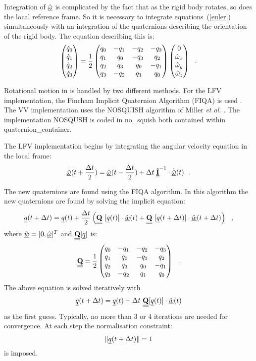 Integration of $\hat{\mbox{$\underline{\omega}$}}$ is complicated by the fact that as the
rigid body rotates, so does the local reference frame.  So it is necessary
to integrate equations~(\ref{euler}) simultaneously with an integration of
the quaternions describing the orientation of the rigid body.  The equation
describing this is:
\begin{equation}
\begin{pmatrix}
\dot{q}_0 \cr \dot{q}_1 \cr \dot{q}_2 \cr \dot{q}_3 \cr
\end{pmatrix}= {1 \over 2}
\begin{pmatrix}
q_0 & -q_1 & -q_2 & -q_3 \cr
q_1 & ~q_0 & -q_3 & ~q_2 \cr
q_2 & ~q_3 & ~q_0 & -q_1 \cr
q_3 & -q_2 & ~q_1 & ~q_0
\end{pmatrix}
\begin{pmatrix}
0 \cr \hat{\omega}_{x} \cr \hat{\omega}_{y} \cr \hat{\omega}_{z}
\end{pmatrix}~~.
\end{equation}

Rotational motion in \D is handled by two different methods.  For the LFV implementation,
the Fincham Implicit Quaternion Algorithm (FIQA) is used
\cite{fincham-92a}.  The VV implementation uses the NOSQUISH
algorithm of Miller {\em et al.} \cite{miller-02a}.  The implementation NOSQUSH is coded in {\sc no\_squish} both contained within
{\sc quaternion\_container}.

The LFV implementation begins by integrating the angular velocity equation in the local frame:
\begin{equation}
\hat{\mbox{$\underline{\omega}$}}(t+{ \Delta t\over 2}) = \hat{\mbox{$\underline{\omega}$}}(t-{ \Delta t\over 2}) +
 \Delta t \; \hat{\mbox{$\underline{\underline{\bf I}}$}}^{-1} \cdot \dot{\hat{\mbox{$\underline{\omega}$}}}(t)~~.
\end{equation}

The new quaternions are found using the FIQA algorithm.
In this algorithm the new quaternions are found by solving the implicit equation:
\begin{equation}
\mbox{$\underline{q}$}(t+\Delta t) = \mbox{$\underline{q}$}(t) + {\Delta t\over 2}
\left( \mbox{$\underline{\underline{\bf Q}}$}~[\mbox{$\underline{q}$}(t)] \cdot \hat{\mbox{$\underline{w}$}}(t) +
\mbox{$\underline{\underline{\bf Q}}$}~[\mbox{$\underline{q}$}(t+\Delta t)] \cdot \hat{\mbox{$\underline{w}$}}(t+\Delta t)\right)~~,
\end{equation}
where $\hat{\mbox{$\underline{w}$}} = [ 0,\hat{\mbox{$\underline{\omega}$}}]^T$ and $\mbox{$\underline{\underline{\bf Q}}$}[\mbox{$\underline{q}$}]$ is:
\begin{equation}
\mbox{$\underline{\underline{\bf Q}}$} = {1 \over 2}
\begin{pmatrix}
q_0 & -q_1 & -q_2 & -q_3 \cr
q_1 & ~q_0 & -q_3 & ~q_2 \cr
q_2 & ~q_3 & ~q_0 & -q_1 \cr
q_3 & -q_2 & ~q_1 & ~q_0
\end{pmatrix}~~.
\end{equation}
The above equation is solved iteratively with
\begin{equation}
{\mbox{$\underline{q}$}}(t+\Delta t) = {\mbox{$\underline{q}$}}(t) + \Delta t~\mbox{$\underline{\underline{\bf Q}}$}[{\mbox{$\underline{q}$}}(t)] \cdot \hat{\mbox{$\underline{w}$}}(t)
\end{equation}
as the first guess.  Typically, no more than 3 or 4 iterations are needed for convergence.
At each step the normalisation constraint:
\begin{equation}
\| \mbox{$\underline{q}$}(t+\Delta t) \| = 1
\end{equation}
is imposed.

